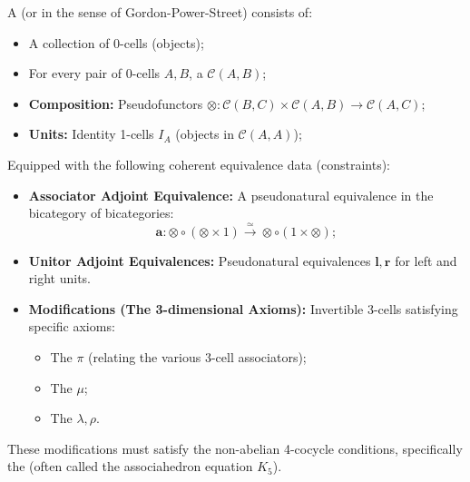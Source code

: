 \begin{definition} \label{definition:tricategory}
A  (or  in the sense of Gordon-Power-Street) consists of:
\begin{itemize}
    \item A collection of 0-cells (objects);
    \item For every pair of 0-cells $A, B$, a  $\mathcal{C}(A, B)$;
    \item \textbf{Composition:} Pseudofunctors $\otimes: \mathcal{C}(B, C) \times \mathcal{C}(A, B) \to \mathcal{C}(A, C)$;
    \item \textbf{Units:} Identity 1-cells $I_A$ (objects in $\mathcal{C}(A, A)$);
\end{itemize}
Equipped with the following coherent equivalence data (constraints):
\begin{itemize}
    \item \textbf{Associator Adjoint Equivalence:} A pseudonatural equivalence in the bicategory of bicategories:
    $$
    \mathbf{a}: \otimes \circ (\otimes \times 1) \xrightarrow{\simeq} \otimes \circ (1 \times \otimes);
    $$
    \item \textbf{Unitor Adjoint Equivalences:} Pseudonatural equivalences $\mathbf{l}, \mathbf{r}$ for left and right units.
    \item \textbf{Modifications (The 3-dimensional Axioms):} Invertible 3-cells satisfying specific axioms:
    \begin{itemize}
        \item The  $\pi$ (relating the various 3-cell associators);
        \item The  $\mu$;
        \item The  $\lambda, \rho$.
    \end{itemize}
\end{itemize}
These modifications must satisfy the non-abelian 4-cocycle conditions, specifically the  (often called the associahedron equation $K_5$).
\end{definition}